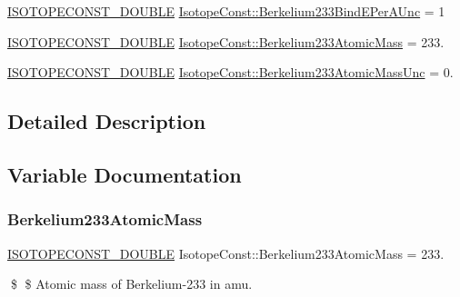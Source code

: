 \begin{DoxyCompactItemize}
\mbox{\hyperlink{group___isotope_const-_macros_ga8f45a7272ce02c0b4c65c44636ed719a}{I\+S\+O\+T\+O\+P\+E\+C\+O\+N\+S\+T\+\_\+\+D\+O\+U\+B\+LE}} \mbox{\hyperlink{group___isotope_const-_berkelium-_bk233_ga250bb9742f826ad53c63f526e8bc8b50}{Isotope\+Const\+::\+Berkelium233\+Bind\+E\+Per\+A\+Unc}} = 1
\item 
\mbox{\hyperlink{group___isotope_const-_macros_ga8f45a7272ce02c0b4c65c44636ed719a}{I\+S\+O\+T\+O\+P\+E\+C\+O\+N\+S\+T\+\_\+\+D\+O\+U\+B\+LE}} \mbox{\hyperlink{group___isotope_const-_berkelium-_bk233_ga05bf030c566485c26a123a04f96a413e}{Isotope\+Const\+::\+Berkelium233\+Atomic\+Mass}} = 233.
\item 
\mbox{\hyperlink{group___isotope_const-_macros_ga8f45a7272ce02c0b4c65c44636ed719a}{I\+S\+O\+T\+O\+P\+E\+C\+O\+N\+S\+T\+\_\+\+D\+O\+U\+B\+LE}} \mbox{\hyperlink{group___isotope_const-_berkelium-_bk233_gab842dd9bc82de9a7ddf80fe3239240ed}{Isotope\+Const\+::\+Berkelium233\+Atomic\+Mass\+Unc}} = 0.
\end{DoxyCompactItemize}


\subsection{Detailed Description}


\subsection{Variable Documentation}
\mbox{\label{group___isotope_const-_berkelium-_bk233_ga05bf030c566485c26a123a04f96a413e}} 
\subsubsection{\texorpdfstring{Berkelium233\+Atomic\+Mass}{Berkelium233AtomicMass}}
{\footnotesize\ttfamily \mbox{\hyperlink{group___isotope_const-_macros_ga8f45a7272ce02c0b4c65c44636ed719a}{I\+S\+O\+T\+O\+P\+E\+C\+O\+N\+S\+T\+\_\+\+D\+O\+U\+B\+LE}} Isotope\+Const\+::\+Berkelium233\+Atomic\+Mass = 233.}

\$ \$ Atomic mass of Berkelium-\/233 in amu. \mbox{\label{group___isotope_const-_berkelium-_bk233_gab842dd9bc82de9a7ddf80fe3239240ed}} 
